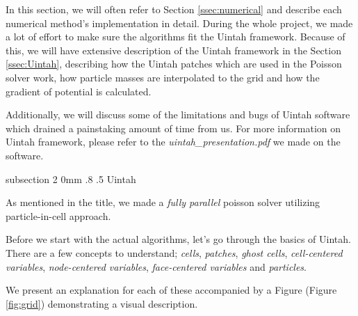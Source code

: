 \documentclass[notitlepage, 12pt]{article}
\makeatletter
\renewcommand{\subsection}{\@startsection    %
        {subsection}
        {2}
        {0mm}
        {.8\baselineskip}
        {.5\baselineskip}
        {\bfseries\normalsize}}
\makeatother
\begin{document}
In this section, we will often refer to Section \ref{ssec:numerical} and describe each numerical method's implementation in detail. During the whole 
project, we made a lot of effort to make sure the algorithms fit the Uintah framework. Because of this, we will have extensive description of 
the Uintah framework in the Section \ref{ssec:Uintah}, describing how the Uintah patches which are used in the Poisson solver work, 
how particle masses are interpolated to the grid and how the gradient of potential is calculated. 

Additionally, we will discuss some of the limitations and 
bugs of Uintah software which drained a painstaking amount of time from us. For more information on Uintah framework, please refer to the \emph{uintah\_presentation.pdf} 
we made on the software.

\subsection{Uintah} \label{ssec:Uintah}

As mentioned in the title, we made a \emph{fully parallel} poisson solver utilizing particle-in-cell approach.

Before we start with the actual algorithms, let's go through the basics of Uintah. There are a few concepts to understand; \emph{cells}, \emph{patches}, 
\emph{ghost cells}, \emph{cell-centered variables}, \emph{node-centered variables}, \emph{face-centered variables} and \emph{particles}. 

We present an explanation for each of these accompanied by a Figure (Figure \ref{fig:grid}) demonstrating a visual description.
\end{document}
